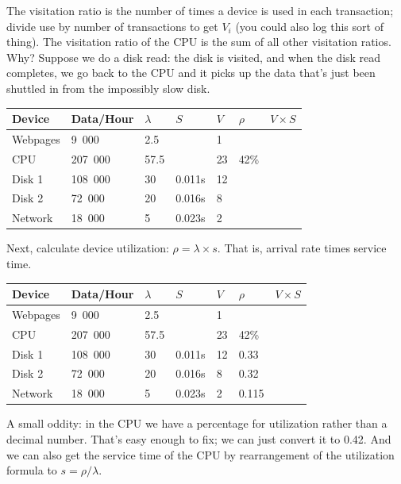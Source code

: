 The visitation ratio is the number of times a device is used in each transaction; divide use by number of transactions to get $V_{i}$ (you could also log this sort of thing). The visitation ratio of the CPU is the sum of all other visitation ratios. Why? Suppose we do a disk read: the disk is visited, and when the disk read completes, we go back to the CPU and it picks up the data that's just been shuttled in from the impossibly slow disk.

\begin{center}
\begin{tabular}{|l|l|l|l|l|l|l|} \hline
	\textbf{Device} & \textbf{Data/Hour} & \textbf{$\lambda$} & \textbf{$S$} & \textbf{$V$} & \textbf{$\rho$} & \textbf{$V \times S$} \\ \hline
	Webpages & 9~000 & 2.5 & & 1 & & \\ \hline
	CPU & 207~000 & 57.5 &  & 23 & 42\% & \\ \hline
	Disk 1 & 108~000 & 30 & 0.011s  & 12& &\\ \hline
	Disk 2 & 72~000 & 20 & 0.016s & 8 & &\\ \hline
	Network & 18~000 & 5 & 0.023s & 2 & &\\ \hline
\end{tabular}
\end{center}

Next, calculate device utilization: $\rho = \lambda \times s$. That is, arrival rate times service time.

\begin{center}
\begin{tabular}{|l|l|l|l|l|l|l|} \hline
	\textbf{Device} & \textbf{Data/Hour} & \textbf{$\lambda$} & \textbf{$S$} & \textbf{$V$} & \textbf{$\rho$} & \textbf{$V \times S$} \\ \hline
	Webpages & 9~000 & 2.5 & & 1 & & \\ \hline
	CPU & 207~000 & 57.5 &  & 23 & 42\% & \\ \hline
	Disk 1 & 108~000 & 30 & 0.011s  & 12& 0.33 &\\ \hline
	Disk 2 & 72~000 & 20 & 0.016s & 8 & 0.32 &\\ \hline
	Network & 18~000 & 5 & 0.023s & 2 & 0.115 &\\ \hline
\end{tabular}
\end{center}

A small oddity: in the CPU we have a percentage for utilization rather than a decimal number. That's easy enough to fix; we can just convert it to 0.42. And we can also get the service time of the CPU by rearrangement of the utilization formula to $s = \rho / \lambda$.

